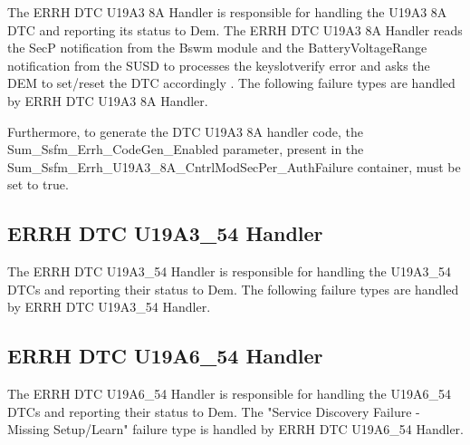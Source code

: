 The ERRH DTC U19A3 8A Handler is responsible for handling the U19A3 8A DTC and reporting its status to Dem. 
The ERRH DTC U19A3 8A Handler reads the SecP notification from the Bswm module and the BatteryVoltageRange notification from the SUSD to processes the keyslotverify error and asks the DEM to set/reset the DTC accordingly .
The following failure types are handled by ERRH DTC U19A3 8A Handler.
{
    
}


Furthermore, to generate the DTC  U19A3 8A handler code, the Sum_Ssfm_Errh_CodeGen_Enabled parameter, present in the Sum_Ssfm_Errh_U19A3_8A_CntrlModSecPer_AuthFailure container, must be set to true. 

{         }

\subsection{ERRH DTC U19A3_54 Handler}
\label{subsec:ERRH_DTC_U19A3_54}

The ERRH DTC U19A3_54 Handler is responsible for handling the U19A3_54 DTCs and reporting their status to Dem.
The following failure types are handled by ERRH DTC U19A3_54 Handler. 
{
    
}


{     }

\subsection{ERRH DTC U19A6_54 Handler}
\label{subsec:ERRHDTCU19A654}

The ERRH DTC U19A6_54 Handler is responsible for handling the U19A6_54 DTCs and reporting their status to Dem.
The "Service Discovery Failure - Missing Setup/Learn" failure type is handled by ERRH DTC U19A6_54 Handler. 

